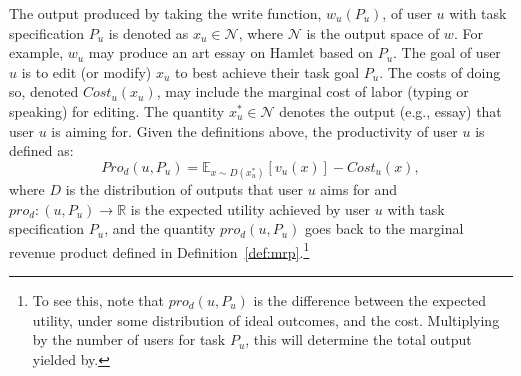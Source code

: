 \documentclass{article} %
\begin{document}
The output produced by taking the write function, $w_u(P_u)$, of user $u$ with task specification $P_u$ is denoted as $x_u \in \mathcal{N}$, where $\mathcal{N}$ is the output space of $w$.
For example, $w_u$ may produce an art essay on Hamlet based on $P_u$.
The goal of user $u$ is to edit (or modify) $x_u$ to best achieve their task goal $P_u$.
The costs of doing so, denoted $Cost_u(x_u)$, may include the marginal cost of labor (typing or speaking) for editing.
The quantity $x^*_u \in \mathcal{N}$ denotes the output (e.g., essay) that user $u$ is aiming for.
Given the definitions above, the productivity of user $u$ is defined as:
\begin{equation}
    Pro_d(u, P_u) = \mathbb{E}_{x \sim D (x^*_u)} \left[ v_u \left( x \right) \right] - Cost_u \left( x \right),
\end{equation}
where $D$ is the distribution of outputs that user $u$ aims for and $pro_d: (u, P_u) \to \mathbb{R}$ is the expected utility achieved by user $u$ with task specification $P_u$, and the quantity $pro_d(u, P_u)$ goes back to the marginal revenue product defined in Definition~\ref{def:mrp}.\footnote{To see this, note that $pro_d(u, P_u)$ is the difference between the expected utility, under some distribution of ideal outcomes, and the cost. Multiplying by the number of users for task $P_u$, this will determine the total output yielded by.}
\end{document}
